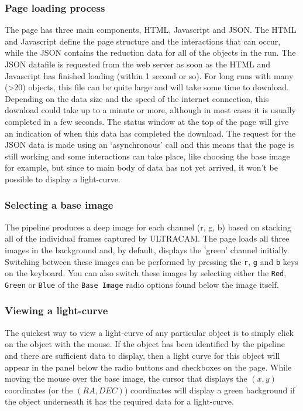 \subsubsection{Page loading process}
The page has three main components, HTML, Javascript and JSON. The HTML and Javascript define the page structure and the interactions that can occur, while the JSON contains the reduction data for all of the objects in the run. The JSON datafile is requested from the web server as soon as the HTML and Javascript has finished loading (within 1 second or so). For long runs with many (\textgreater 20) objects, this file can be quite large and will take some time to download. Depending on the data size and the speed of the internet connection, this download could take up to a minute or more, although in most cases it is usually completed in a few seconds. The status window at the top of the page will give an indication of when this data has completed the download. The request for the JSON data is made using an `asynchronous' call and this means that the page is still working and some interactions can take place, like choosing the base image for example, but since to main body of data has not yet arrived, it won't be possible to display a light-curve.  

\subsubsection{Selecting a base image}
The pipeline produces a deep image for each channel (r, g, b) based on stacking all of the individual frames captured by ULTRACAM. The page loads all three images in the background and, by default, displays the 'green' channel initially. Switching between these images can be performed by pressing the \texttt{r}, \texttt{g} and \texttt{b} keys on the keyboard. You can also switch these images by selecting either the \texttt{Red},  \texttt{Green} or \texttt{Blue} of the \texttt{Base Image} radio options found below the image itself.

\subsubsection{Viewing a light-curve}
The quickest way to view a light-curve of any particular object is to simply click on the object with the mouse. If the object has been identified by the pipeline and there are sufficient data to display, then a light curve for this object will appear in the panel below the radio buttons and checkboxes on the page. While moving the mouse over the base image, the cursor that displays the $(x, y)$ coordinates (or the $(RA, DEC)$) coordinates will display a green background if the object underneath it has the required data for a light-curve.

